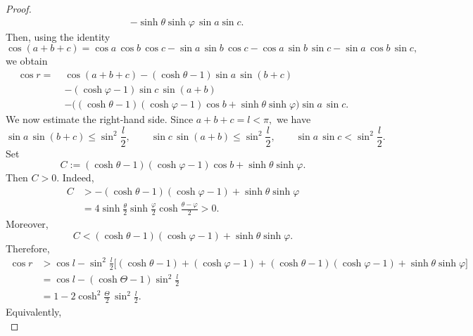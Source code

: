 \documentclass[10pt,a4paper]{amsart}
\begin{document}
\begin{proof}
\begin{equation*}
\begin{aligned}
&-\sinh\theta\sinh\varphi\,\sin a\sin c.
\end{aligned}
\end{equation*}
Then, using the identity
\begin{equation*}
\cos(a+b+c)
=
\cos a\,\cos b\,\cos c
-\sin a\,\sin b\,\cos c
-\cos a\,\sin b\,\sin c
-\sin a\,\cos b\,\sin c,
\end{equation*}
we obtain
\begin{equation*}
\begin{aligned}
\cos r
=\;&
\cos(a+b+c)
-(\cosh\theta-1)\sin a\,\sin(b+c)\\
&-(\cosh\varphi-1)\sin c\,\sin(a+b)\\
&-\Big((\cosh\theta-1)(\cosh\varphi-1)\cos b
+\sinh\theta\sinh\varphi\Big)\sin a\,\sin c.
\end{aligned}
\end{equation*}
We now estimate the right-hand side. Since $a+b+c=l<\pi,$
we have
\begin{equation*}
\sin a\, \sin(b+c)\leq \sin^2\frac{l}{2},
\qquad
\sin c\, \sin(a+b)\leq \sin^2\frac{l}{2},\qquad \sin a\, \sin c< \sin^2\frac{l}{2}.
\end{equation*}
Set
\begin{equation*}
C:=(\cosh\theta-1)(\cosh\varphi-1)\cos b
+\sinh\theta\sinh\varphi.
\end{equation*}
Then $C > 0$. Indeed,
\begin{equation*}
\begin{aligned}
C&>
-(\cosh\theta-1)(\cosh\varphi-1)
+\sinh\theta\sinh\varphi\\
&=
4\sinh\frac\theta2\sinh\frac{\varphi}{2}
\cosh\frac{\theta-\varphi}{2}
>0.
\end{aligned}
\end{equation*}
Moreover, 
\begin{equation*}
C<(\cosh\theta-1)(\cosh\varphi-1)
+\sinh\theta\sinh\varphi.
\end{equation*}
Therefore,
\begin{equation*}
\begin{aligned}
\cos r
&>
\cos l-\sin^2\frac{l}{2}
\Big[(\cosh\theta-1)+(\cosh\varphi-1)
+(\cosh\theta-1)(\cosh\varphi-1)
+\sinh\theta\sinh\varphi\Big]\\
&=\cos l-(\cosh\Theta-1)\sin^2\frac{l}{2}\\
&=1-2\cosh^2\frac{\Theta}{2}\,\sin^2\frac{l}{2}.
\end{aligned}
\end{equation*}
Equivalently,
\begin{equation*}

\end{equation*}
\end{proof}
\end{document}
